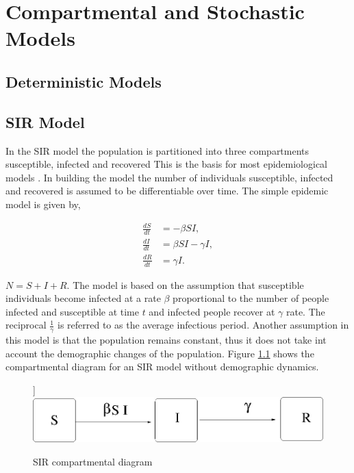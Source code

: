 \chapter{Compartmental and Stochastic Models}
\section{Deterministic Models}

\section{SIR Model}

In the SIR model the population is partitioned into three compartments susceptible, infected and recovered This is the basis for most epidemiological models \citep{m1925applications}. In building the model the number of individuals susceptible, infected and recovered is assumed to be differentiable over time.
The simple epidemic model is given by,
\begin{center}
\begin{align} \label{eqn4.1}
\frac{dS}{dt} &= -\beta SI,\\
 \frac{dI}{dt} &=\beta S I - \gamma  I, \\
 \frac{dR}{dt} &= \gamma  I.
\end{align}
\end{center}

$N = S + I + R.$
The model is based on the assumption that susceptible individuals become infected at a rate $\beta$ proportional to the number of people infected and susceptible at time $t$ and infected people recover at $\gamma$ rate. The reciprocal $\frac{1}{\gamma}$ is referred to as the average infectious period. Another assumption in this model is that the population remains constant, thus it does not take int account the demographic changes of the population. Figure \ref{fig 4.1} shows the compartmental diagram for an SIR model without demographic dynamics.
\begin{figure}[h!]
\caption{SIR compartmental diagram}]\label{fig 4.1}
\centering
\includegraphics[scale=0.5]{images/sir.jpg} 
\end{figure}



